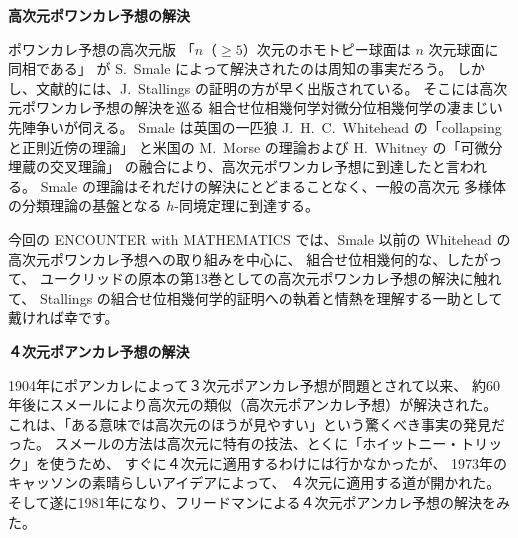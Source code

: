 \documentclass[uplatex,dvipdfmx]{jlreq}
\begin{document}
\newpage

\begin{center}
  {\Large\bfseries 高次元ポワンカレ予想の解決}
\end{center}

\bigskip
\hspace*{\fill}{\large\bfseries 加藤　十吉（九州大学・数理学研究院）}

\bigskip

ポワンカレ予想の高次元版
「$n$（$\geq 5$）次元のホモトピー球面は $n$ 次元球面に同相である」
が S.~Smale によって解決されたのは周知の事実だろう。
しかし、文献的には、J.~Stallings の証明の方が早く出版されている。
そこには高次元ポワンカレ予想の解決を巡る
組合せ位相幾何学対微分位相幾何学の凄まじい先陣争いが伺える。
Smale は英国の一匹狼 J.~H.~C.~Whitehead の「collapsing と正則近傍の理論」
と米国の M.~Morse の理論および H.~Whitney の「可微分埋蔵の交叉理論」
の融合により、高次元ポワンカレ予想に到達したと言われる。
Smale の理論はそれだけの解決にとどまることなく、一般の高次元
多様体の分類理論の基盤となる $h$-同境定理に到達する。

\vspace{1pc}

今回の ENCOUNTER with MATHEMATICS では、Smale 以前の
Whitehead の高次元ポワンカレ予想への取り組みを中心に、
組合せ位相幾何的な、したがって、
ユークリッドの原本の第13巻としての高次元ポワンカレ予想の解決に触れて、
Stallings の組合せ位相幾何学的証明への執着と情熱を理解する一助として
戴ければ幸です。

\newpage

\begin{center}
  {\Large\bfseries ４次元ポアンカレ予想の解決}
\end{center}

\bigskip
\hspace*{\fill}{\large\bfseries 松本　幸夫（東大・数理）}

\bigskip

1904年にポアンカレによって３次元ポアンカレ予想が問題とされて以来、
約60年後にスメールにより高次元の類似（高次元ポアンカレ予想）が解決された。
これは、「ある意味では高次元のほうが見やすい」という驚くべき事実の発見だった。
スメールの方法は高次元に特有の技法、とくに「ホイットニー・トリック」を使うため、
すぐに４次元に適用するわけには行かなかったが、
1973年のキャッソンの素晴らしいアイデアによって、
４次元に適用する道が開かれた。
そして遂に1981年になり、フリードマンによる４次元ポアンカレ予想の解決をみた。
\end{document}
